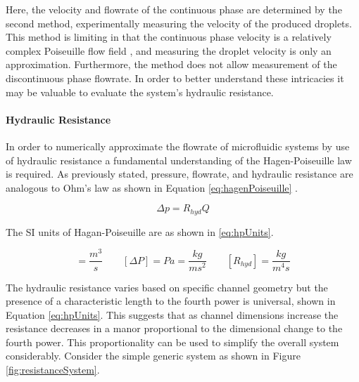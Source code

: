 Here, the velocity and flowrate of the continuous phase are determined by the second method, experimentally measuring the velocity of the produced droplets. This method is limiting in that the continuous phase velocity is a relatively complex Poiseuille flow field \cite{Bruus2008}, and measuring the droplet velocity is only an approximation. Furthermore, the method does not allow measurement of the discontinuous phase flowrate. In order to better understand these intricacies it may be valuable to evaluate the system's hydraulic resistance.

\paragraph{Hydraulic Resistance} In order to numerically approximate the flowrate of microfluidic systems by use of hydraulic resistance a fundamental understanding of the Hagen-Poiseuille law is required. As previously stated, pressure, flowrate, and hydraulic resistance are analogous to Ohm's law as shown in Equation \vref{eq:hagenPoiseuille} \cite{Bruus2008}.

\begin{equation}
\Delta p  = R_{hyd} Q
\label{eq:hagenPoiseuille}
\end{equation}

The SI units of Hagan-Poiseuille are as shown in \vref{eq:hpUnits}.

\begin{equation}
[Q] = \frac{m^3}{s} \qquad [\Delta P] = Pa = \frac{kg}{m s^2}  \qquad [R_{hyd}]= \frac{kg}{m^4 s}
\label{eq:hpUnits}
\end{equation}

The hydraulic resistance varies based on specific channel geometry but the presence of a characteristic length to the fourth power is universal, shown in Equation \ref{eq:hpUnits}. This suggests that as channel dimensions increase the resistance decreases in a manor proportional to the dimensional change to the fourth power. This proportionality can be used to simplify the overall system considerably. Consider the simple generic system as shown in Figure \vref{fig:resistanceSystem}.



